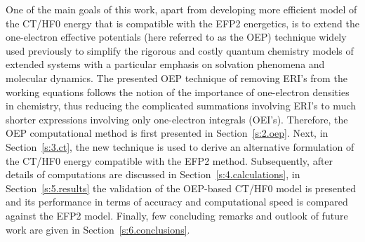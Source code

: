\documentclass[aip,jcp,amsmath,amssymb,reprint,floatfix]{revtex4-1}
\begin{document}
One of the main goals of this work, apart from developing
more efficient model of the CT/HF0 energy that
is compatible with the EFP2 energetics, is to
extend the one\hyp{}electron effective potentials (here referred to as the OEP) 
technique
widely
used previously\cite{Roothaan.RevModPhys.1951,
Hohenberg.Kohn.PhysRev.1964,
Kohn.Sham.PhysRev.1965,
Otto.Ladik.ChemPhys.1975,
Holas.March.PhysRevA.1991,
Weber.Thiel.TCA.2000,
Neese.JCP.2005,
Cisneros.Andres.Piquemal.Darden.JCP.2005,
Piquemal.Cisneros.Reinhardt.Gresh.Darden.JCP.2006,
Li.Gordon.Jensen.JCP.2006,
Blasiak.Lee.Cho.JCP.2013,
Blasiak.Maj.Cho.Gora.JCTC.2015}
to simplify the rigorous and costly quantum chemistry models of extended systems
with a particular emphasis on solvation phenomena and molecular dynamics.
The presented OEP technique of removing ERI's from the working
equations
follows the notion of the importance of 
one\hyp{}electron densities in chemistry\cite{Kohn.Sham.PhysRev.1965,Holas.March.PhysRevA.1991},
thus reducing the complicated summations involving ERI's to much shorter expressions involving
only one\hyp{}electron integrals (OEI's).
Therefore, the OEP computational method is first presented in Section~\ref{s:2.oep}.
Next, in Section~\ref{s:3.ct},
the new technique is used to derive an alternative formulation of the CT/HF0 energy
compatible with the EFP2 method. Subsequently, after details of computations
are discussed in Section~\ref{s:4.calculations}, in Section~\ref{s:5.results} the validation of the 
OEP\hyp{}based CT/HF0 model is presented and its performance in terms 
of accuracy and computational speed is compared against the EFP2
model. Finally, few concluding remarks and outlook of future work
are given in Section~\ref{s:6.conclusions}.
%
\end{document}
